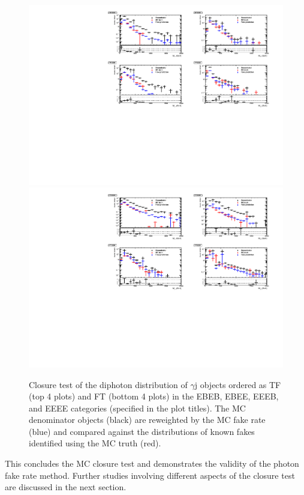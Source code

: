 \begin{figure}[!htbp]
  \centering
  \includegraphics[scale=0.80]{figures/closure_test_diphoton_kinematics_TF_all.pdf}      
  \includegraphics[scale=0.80]{figures/closure_test_diphoton_kinematics_FT_all.pdf}
  \caption{Closure test of the diphoton \Mgg distribution of $\gamma$j objects ordered as TF (top 4 plots) and FT (bottom 4 plots) in the EBEB, EBEE, EEEB, and EEEE categories (specified in the plot titles). The MC denominator objects (black) are reweighted by the MC fake rate (blue) and compared against the distributions of known fakes identified using the MC truth (red).}
  \label{fig:closure_test_diphoton_kinematics_TF_FT}
\end{figure}


This concludes the MC closure test and demonstrates the validity of the photon fake rate method. Further studies involving different aspects of the closure test are discussed in the next section.


